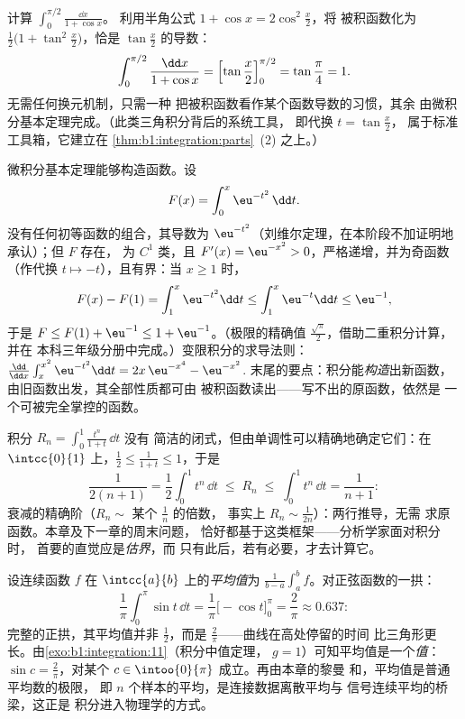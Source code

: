 \begin{example}[一眼识别导数]\label{ex:b1:integration:halfangle}
计算 $\displaystyle\int_0^{\pi/2} \frac{\dd x}{1 + \cos x}$。
利用半角公式 $1 + \cos x = 2\cos^2\frac x2$，将
被积函数化为 $\frac{1}{2}\bigl(1 + \tan^2\frac
x2\bigr)$，恰是 $\tan\frac x2$ 的导数：
\[
\int_0^{\pi/2} \frac{\dd x}{1 + \cos x}
= \Bigl[\tan\frac x2\Bigr]_0^{\pi/2} = \tan\frac\pi4 = 1 .
\]
无需任何换元机制，只需一种
把被积函数看作某个函数导数的习惯，其余
由微积分基本定理完成。（此类三角积分背后的系统工具，
即代换 $t = \tan\frac x2$，
属于标准工具箱，它建立在
\cref{thm:b1:integration:parts}~(2) 之上。）
\end{example}

\begin{example}[由积分定义的函数]\label{ex:b1:integration:definedby}
微积分基本定理能够构造函数。设
\[
F(x) = \int_0^x \eu^{-t^2}\,\dd t .
\]
没有任何初等函数的组合，其导数为
$\eu^{-t^2}$（刘维尔定理，在本阶段不加证明地承认）；但 $F$ 存在，
为 $C^1$ 类，且 $F'(x) = \eu^{-x^2} > 0$，严格递增，并为奇函数
（作代换 $t \mapsto -t$），且有界：当 $x \geq 1$ 时，
\[
F(x) - F(1) = \int_1^x \eu^{-t^2}\dd t
\leq \int_1^x \eu^{-t}\dd t \leq \eu^{-1} ,
\]
于是 $F \leq F(1) + \eu^{-1} \leq 1 + \eu^{-1}$。（极限的精确值
$\frac{\sqrt\pi}{2}$，借助二重积分计算，并在
本科三年级分册中完成。）变限积分的求导法则：$\frac{\dd}{\dd
x}\int_x^{x^2} \eu^{-t^2}\dd t = 2x\,\eu^{-x^4} - \eu^{-x^2}$.
末尾的要点：积分能\emph{构造}出新函数，
由旧函数出发，其全部性质都可由
被积函数读出——写不出的原函数，依然是
一个可被完全掌控的函数。
\end{example}

\begin{example}[不计算而估计]\label{ex:b1:integration:estimate}
积分 $R_n = \int_0^1 \frac{t^n}{1 + t}\,\dd t$ 没有
简洁的闭式，但由单调性可以精确地确定它们：在
$\intcc{0}{1}$ 上，$\frac12 \leq \frac{1}{1+t} \leq 1$，于是
\[
\frac{1}{2(n+1)} = \frac12\int_0^1 t^n\,\dd t
\;\leq\; R_n \;\leq\; \int_0^1 t^n \,\dd t = \frac{1}{n+1} :
\]
衰减的精确阶（$R_n \sim$ 某个 $\frac1n$ 的倍数，
事实上 $R_n \sim \frac{1}{2n}$）：两行推导，无需
求原函数。本章及下一章的周末问题，
恰好都基于这类框架——分析学家面对积分时，
首要的直觉应是\emph{估界}，而
只有此后，若有必要，才去计算它。
\end{example}

\begin{example}[平均值]\label{ex:b1:integration:average}
设连续函数 $f$ 在 $\intcc{a}{b}$ 上的\emph{平均值}为
$\frac{1}{b-a}\int_a^b f$。对正弦函数的一拱：
\[
\frac{1}{\pi}\int_0^\pi \sin t\,\dd t
= \frac{1}{\pi}\bigl[-\cos t\bigr]_0^\pi = \frac{2}{\pi}
\approx 0.637 :
\]
完整的正拱，其平均值并非 $\frac12$，而是
$\frac2\pi$——曲线在高处停留的时间
比三角形更长。由\cref{exo:b1:integration:11}（积分中值定理，
$g = 1$）可知平均值是一个\emph{值}：$\sin c =
\frac2\pi$，对某个 $c \in \intoo{0}{\pi}$ 成立。再由本章的黎曼
和，平均值是普通平均数的极限，
即 $n$ 个样本的平均，是连接数据离散平均与
信号连续平均的桥梁，这正是
积分进入物理学的方式。
\end{example}

